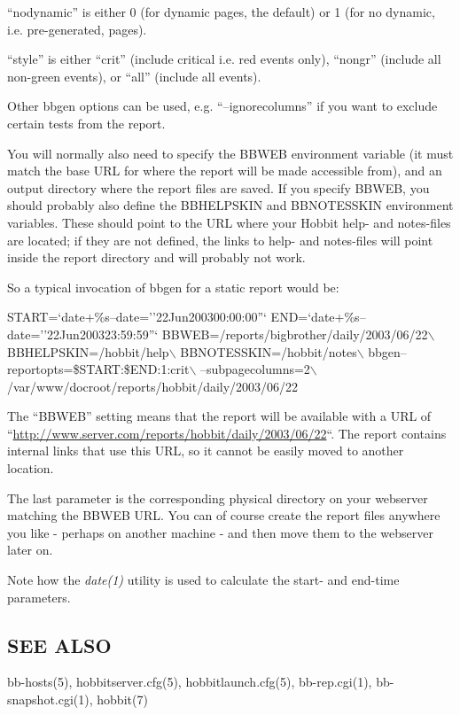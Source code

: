   ``nodynamic'' is either 0 (for dynamic pages, the default) or 1 (for no dynamic, i.e. pre-generated, pages). 


  ``style'' is either ``crit'' (include critical i.e. red events only), ``nongr'' (include all non-green events), or ``all'' (include all events). 


  Other bbgen options can be used, e.g. ``--ignorecolumns'' if you want to exclude certain tests from the report. 


  You will normally also need to specify the BBWEB environment
  variable (it must match the base URL for where the report will be
  made accessible from), and an output directory where the report
  files are saved. If you specify BBWEB, you should probably also
  define the BBHELPSKIN and BBNOTESSKIN environment variables. These
  should point to the URL where your Hobbit help- and notes-files are
  located; if they are not defined, the links to help- and notes-files
  will point inside the report directory and will probably not work. 



  So a typical invocation of bbgen for a static report would be: 


  
START=`date+\%s--date=''22Jun200300:00:00''`  
END=`date+\%s--date=''22Jun200323:59:59''`  
BBWEB=/reports/bigbrother/daily/2003/06/22$\backslash$  
BBHELPSKIN=/hobbit/help$\backslash$  
BBNOTESSKIN=/hobbit/notes$\backslash$  
bbgen--reportopts=\$START:\$END:1:crit$\backslash$  
--subpagecolumns=2$\backslash$  
/var/www/docroot/reports/hobbit/daily/2003/06/22 


  The ``BBWEB'' setting means that the report will be available with a
  URL of
  ``\url{http://www.server.com/reports/hobbit/daily/2003/06/22}``. The
  report contains internal links that use this URL, so it cannot be
  easily moved to another location. 



  The last parameter is the corresponding physical directory on your
  webserver matching the BBWEB URL. You can of course create the
  report files anywhere you like - perhaps on another machine - and
  then move them to the webserver later on. 



  Note how the \emph{date(1)}
 utility is used to calculate the start- and end-time parameters. 


 
\subsection{SEE ALSO}
bb-hosts(5), hobbitserver.cfg(5), hobbitlaunch.cfg(5), bb-rep.cgi(1), bb-snapshot.cgi(1), hobbit(7) 


